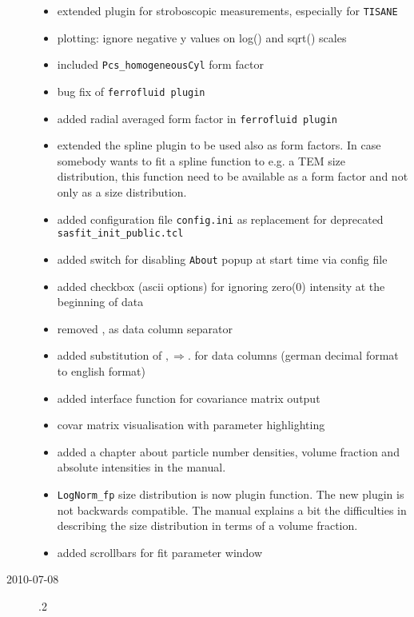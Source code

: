 \begin{description}
\begin{itemize}
        \item extended plugin for stroboscopic measurements, especially for \texttt{TISANE}
        \item plotting: ignore negative y values on log() and sqrt() scales
        \item included \texttt{Pcs\_homogeneousCyl} form factor
        \item bug fix of \texttt{ferrofluid plugin}
        \item added radial averaged form factor in \texttt{ferrofluid plugin}
        \item extended the spline plugin to be used also as form factors.
            In case somebody wants to fit a spline function to e.g. a TEM size distribution,
            this function need to be available as a form factor and not only as a size
            distribution.
        \item added configuration file \texttt{config.ini} as replacement for
            deprecated \texttt{sasfit\_init\_public.tcl}
        \item added switch for disabling \texttt{About} popup at start time via config file
        \item added checkbox (ascii options) for ignoring zero(0) intensity at the beginning
                of data
        \item removed , as data column separator
        \item added substitution of $, \Rightarrow .$   for data columns
                (german decimal format to english format)
        \item added interface function for covariance matrix output
        \item covar matrix visualisation with parameter highlighting
        \item added a chapter about particle number densities, volume fraction
            and absolute intensities in the manual.
        \item \texttt{LogNorm\_fp} size distribution is now plugin function.
            The new plugin is not backwards compatible.
            The manual explains a bit the difficulties in describing the size distribution
            in terms of a volume fraction.
        \item added scrollbars for fit parameter window
        \end{itemize}
    \item[2010-07-08] .2
        \begin{itemize}

\end{itemize}
\end{description}
